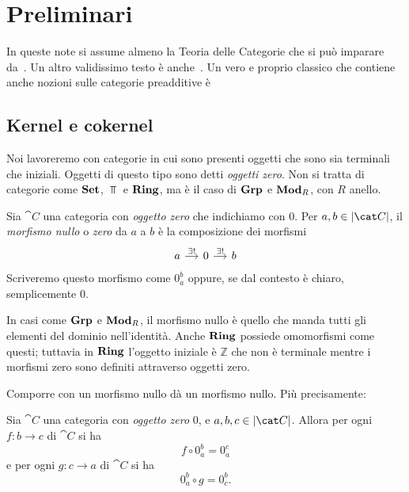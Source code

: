 
\chapter{Preliminari}

In queste note si assume almeno la {\sc Teoria delle Categorie} che si
può imparare da~\cite{leinster:categories}. Un altro validissimo testo è
anche~\cite{riehl:categories}. Un vero e proprio classico che contiene
anche nozioni sulle categorie preadditive è~\cite{maclane:categories}



\section{Kernel e cokernel}

Noi lavoreremo con categorie in cui sono presenti oggetti che sono sia
terminali che iniziali. Oggetti di questo tipo sono detti {\em oggetti
  zero}. Non si tratta di categorie come \(\mathbf{Set}\), \(\Top\) e
\(\mathbf{Ring}\), ma è il caso di \(\mathbf{Grp}\) e \(\mathbf{Mod}_R\), con \(R\) anello.

\begin{definition}
  Sia \(\cat C\) una categoria con {\em oggetto zero} che indichiamo
  con \(0\). Per \(a, b \in \obj{\cat C}\), il {\em morfismo nullo} o
  {\em zero} da \(a\) a \(b\) è la composizione dei morfismi
  \[
    \begin{tikzcd}[column sep=small]
      a \ar["{\exists!}", r] & 0 \ar["{\exists!}", r] & b
    \end{tikzcd}
  \]
  Scriveremo questo morfismo come \(0_a^b\) oppure, se dal contesto è
  chiaro, semplicemente \(0\).
\end{definition}

\begin{example}
  In casi come \(\mathbf{Grp}\) e \(\mathbf{Mod}_R\), il morfismo nullo è quello che
  manda tutti gli elementi del dominio nell'identità. Anche \(\mathbf{Ring}\)
  possiede omomorfismi come questi; tuttavia in \(\mathbf{Ring}\) l'oggetto
  iniziale è \(\mathbb{Z}\) che non è terminale mentre i morfismi zero sono
  definiti attraverso oggetti zero.
\end{example}

Comporre con un morfismo nullo dà un morfismo nullo. Più precisamente:

\begin{proposition}\label{lemma:CompCon0}
  Sia \(\cat C\) una categoria con {\em oggetto zero} \(0\), e
  \(a, b, c \in \obj{\cat C}\). Allora per ogni \(f : b \to c\) di
  \(\cat C\) si ha
  \[
    f \circ 0_a^b = 0_a^c
  \]
  e per ogni \(g : c \to a\) di \(\cat C\) si ha
  \[
    0_a^b \circ g = 0_c^b .
  \]
\end{proposition}

